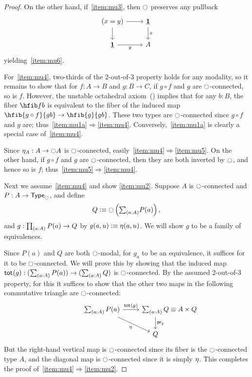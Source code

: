 \begin{proof}
  On the other hand, if~\ref{item:mu3}, then $\modal$ preserves any pullback
  \begin{equation}
  \begin{tikzcd}
  (x=y) \arrow[r] \arrow[d] 
    & \unit \arrow[d,"x"] \\
  \unit \arrow[r,"y"'] 
    & A
  \end{tikzcd}
  \end{equation}
  yielding~\ref{item:mu6}.

  For~\ref{item:mu4}, two-thirds of the 2-out-of-3 property holds for any modality, so it remains to show that for $f:A\to B$ and $g:B\to C$, if $g\circ f$ and $g$ are $\modal$-connected, so is $f$.
  However, the unstable octahedral axiom~(\cite[ex4.4]{TheBook}) implies that for any $b:B$, the fiber $\hfib f b$ is equivalent to the fiber of the induced map $\hfib{g\circ f}{gb} \to \hfib{g}{gb}$.
  These two types are $\modal$-connected since $g\circ f$ and $g$ are; thus~\ref{item:mu1a}$\Rightarrow$\ref{item:mu4}.
  Conversely,~\ref{item:mu1a} is clearly a special case of~\ref{item:mu4}.

  Since $\modalunit[A] : A\to \modal A$ is $\modal$-connected, easily~\ref{item:mu4}$\Rightarrow$\ref{item:mu5}.
  On the other hand, if $g\circ f$ and $g$ are $\modal$-connected, then they are both inverted by $\modal$, and hence so is $f$; thus~\ref{item:mu5}$\Rightarrow$\ref{item:mu4}.

  Next we assume~\ref{item:mu4} and show \ref{item:mu2}.
  Suppose $A$ is $\modal$-connected and $P:A\to\modaltype$, and define
  \[ Q \defeq \modal\left(\sm{a:A} P(a)\right),\]
  and $g:\prd{a:A} P(a) \to Q$ by $g(a,u) \defeq \modalunit(a,u)$.
  We will show $g$ to be a family of equivalences.

  Since $P(a)$ and $Q$ are both $\modal$-modal, for $g_a$ to be an equivalence, it suffices for it to be $\modal$-connected.
  We will prove this by showing that the induced map $\total g:(\sm{a:A} P(a)) \to (\sm{a:A} Q)$ is $\modal$-connected.
  By the assumed 2-out-of-3 property, for this it suffices to show that the other two maps in the following commutative triangle are $\modal$-connected:
  \begin{equation}
  \begin{tikzcd}
  \sm{a:A} P(a) \arrow[r,"{\total g}"] \arrow[dr,swap,"{\modalunit}"]
    & \sm{a:A} Q \mathrlap{\;\jdeq A\times Q} \arrow[d,"\proj2"] \\
  & Q
  \end{tikzcd}
  \end{equation}
  But the right-hand vertical map is $\modal$-connected since its fiber is the $\modal$-connected type $A$,
  and the diagonal map is $\modal$-connected since it is simply $\modalunit$.
  This completes the proof of~\ref{item:mu4}$\Rightarrow$\ref{item:mu2}.


\end{proof}
